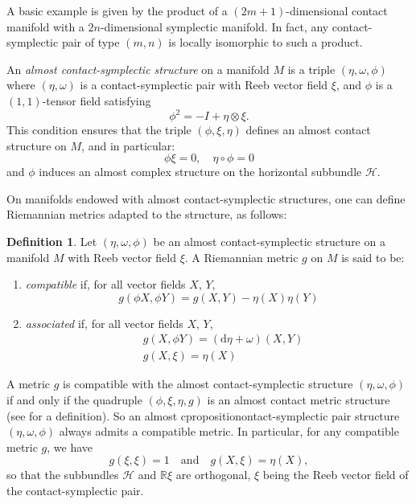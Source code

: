 \documentclass[12pt]{amsart}
\theoremstyle{definition}
\newtheorem{definition}[theorem]{Definition}
\theoremstyle{remark}
\begin{document}
\noindent
A basic example is given by the product of a $(2m+1)$-dimensional contact manifold with a $2n$-dimensional symplectic manifold.
In fact, any contact-symplectic pair of type $(m,n)$ is locally isomorphic to such a product. 

\medskip 
\noindent
 An \emph{almost contact-symplectic structure} on a manifold $M$ is a triple $(\eta, \omega, \phi)$ where $(\eta, \omega)$ is a contact-symplectic pair with Reeb vector field $\xi$, and $\phi$ is a $(1,1)$-tensor field satisfying
\begin{equation*}
 \phi^2=-I +\eta \otimes \xi.
\end{equation*}
This condition ensures that the triple $(  \phi , \xi,   \eta)$ defines an almost contact structure on $M$, and in particular: 
\begin{equation*}
\phi \xi=0 , \quad \eta \circ \phi =0
\end{equation*}
and $\phi$ induces an almost complex structure on the horizontal subbundle $\mathcal{H}$.
 
\medskip 
\noindent
On manifolds endowed with almost contact-symplectic structures, one can define Riemannian metrics adapted to the structure, as follows:

\begin{definition}
Let $(\eta, \omega, \phi)$ be an almost  contact-symplectic structure on a manifold $M$ with Reeb vector field $\xi$.
A Riemannian metric $g$ on $M$ is said to be:
\begin{enumerate}[label=(\roman*)]
\item \emph{compatible}  if, for all vector fields $X$, $Y$,
	\begin{equation*}
	g(\phi X,\phi Y)=g(X,Y)-\eta (X)\eta (Y)
	\end{equation*}
\item \emph{associated}  if, for all vector fields $X$, $Y$,
	 \begin{align*}
	&g(X,\phi Y)=(\mathrm{d}\eta +\omega)(X,Y) \\
	&g(X,\xi)=\eta (X)
	\end{align*} 
\end{enumerate}
\end{definition}

 \noindent
 A metric $g$ is compatible with the almost contact-symplectic structure $(\eta, \omega, \phi)$ if and only if the quadruple $( \phi, \xi, \eta, g)$ is an almost contact metric structure (see \cite{Blairbook} for a definition).
So an almost c{proposition}ontact-symplectic pair structure $(\eta, \omega, \phi)$ always admits a compatible metric. 
In particular, for any compatible metric $g$, we have 
 \begin{equation*}
g(\xi,\xi)=1\quad  \text{and} \quad g(X,\xi)=\eta(X),
\end{equation*}
so that the subbundles $\mathcal{H}$ and $\mathbb{R}\xi$ are orthogonal, $\xi$ being the Reeb vector field of the contact-symplectic pair.
\end{document}
